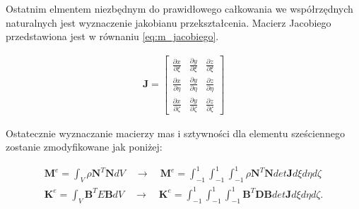 Ostatnim elmentem niezbędnym do prawidłowego całkowania we współrzędnych naturalnych jest wyznaczenie jakobianu przekształcenia. Macierz Jacobiego przedstawiona jest w równaniu \ref{eq:m_jacobiego}.

\begin{gather} \label{eq:m_jacobiego}
	\textbf{J} = \begin{bmatrix} 
	 	\frac{\partial x}{\partial \xi} & \frac{\partial y}{\partial \xi} & \frac{\partial z}{\partial \xi} \\
	 	\frac{\partial x}{\partial \eta} & \frac{\partial y}{\partial \eta} & \frac{\partial z}{\partial \eta} \\
	 	\frac{\partial x}{\partial \zeta} & \frac{\partial y}{\partial \zeta} & \frac{\partial z}{\partial \zeta}
	\end{bmatrix}
\end{gather}

Ostatecznie wyznaczanie macierzy mas i sztywności dla elementu sześciennego zostanie zmodyfikowane jak poniżej:

\begin{equation} \label{eq:f_ksztaltu_hex}
	\begin{aligned}
	\textbf{M}^e = \int_V \rho {\textbf{N}}^T \textbf{N} dV \quad \rightarrow \quad \textbf{M}^e = \int_{-1}^1 \int_{-1}^1 \int_{-1}^1 \rho {\textbf{N}}^T \textbf{N} det\textbf{J} d\xi d\eta d\zeta \\
	\textbf{K}^e = \int_V {\textbf{B}}^T E \textbf{B} dV \quad \rightarrow \quad \textbf{K}^e =  \int_{-1}^1 \int_{-1}^1 \int_{-1}^1  {\textbf{B}}^T \textbf{D} \textbf{B} det\textbf{J} d\xi d\eta d\zeta.
	\end{aligned}
\end{equation}





















